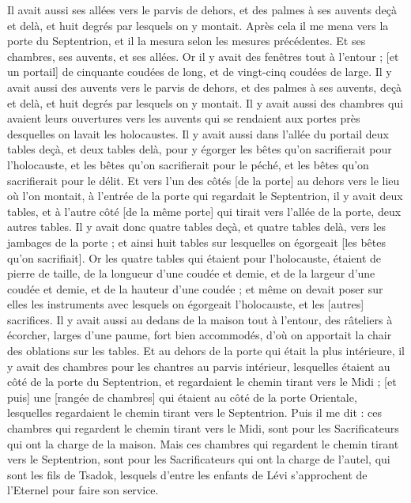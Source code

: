 \begin{multicols}{2}
Il avait aussi ses allées vers le parvis de dehors, et des palmes à ses auvents deçà et delà, et huit degrés par lesquels on y montait.
Après cela il me mena vers la porte du Septentrion, et il la mesura selon les mesures précédentes.
Et ses chambres, ses auvents, et ses allées. Or il y avait des fenêtres tout à l'entour ; [et un portail] de cinquante coudées de long, et de vingt-cinq coudées de large.
Il y avait aussi des auvents vers le parvis de dehors, et des palmes à ses auvents, deçà et delà, et huit degrés par lesquels on y montait.
Il y avait aussi des chambres qui avaient leurs ouvertures vers les auvents qui se rendaient aux portes près desquelles on lavait les holocaustes.
Il y avait aussi dans l'allée du portail deux tables deçà, et deux tables delà, pour y égorger les bêtes qu'on sacrifierait pour l'holocauste, et les bêtes qu'on sacrifierait pour le péché, et les bêtes qu'on sacrifierait pour le délit.
Et vers l'un des côtés [de la porte] au dehors vers le lieu où l'on montait, à l'entrée de la porte qui regardait le Septentrion, il y avait deux tables, et à l'autre côté [de la même porte] qui tirait vers l'allée de la porte, deux autres tables.
Il y avait donc quatre tables deçà, et quatre tables delà, vers les jambages de la porte ; et ainsi huit tables sur lesquelles on égorgeait [les bêtes qu'on sacrifiait].
Or les quatre tables qui étaient pour l'holocauste, étaient de pierre de taille, de la longueur d'une coudée et demie, et de la largeur d'une coudée et demie, et de la hauteur d'une coudée ; et même on devait poser sur elles les instruments avec lesquels on égorgeait l'holocauste, et les [autres] sacrifices.
Il y avait aussi au dedans de la maison tout à l'entour, des râteliers à écorcher, larges d'une paume, fort bien accommodés, d'où on apportait la chair des oblations sur les tables.
Et au dehors de la porte qui était la plus intérieure, il y avait des chambres pour les chantres au parvis intérieur, lesquelles étaient au côté de la porte du Septentrion, et regardaient le chemin tirant vers le Midi ; [et puis] une [rangée de chambres] qui étaient au côté de la porte Orientale, lesquelles regardaient le chemin tirant vers le Septentrion.
Puis il me dit : ces chambres qui regardent le chemin tirant vers le Midi, sont pour les Sacrificateurs qui ont la charge de la maison.
Mais ces chambres qui regardent le chemin tirant vers le Septentrion, sont pour les Sacrificateurs qui ont la charge de l'autel, qui sont les fils de Tsadok, lesquels d'entre les enfants de Lévi s'approchent de l'Eternel pour faire son service.

\end{multicols}
